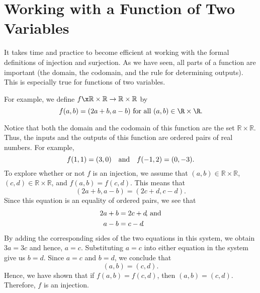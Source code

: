\section*{Working with a Function of Two Variables}
It takes time and practice to become efficient at working with the formal definitions of injection and surjection.  As we have seen, all parts of a function are important (the domain, the codomain, and the rule for determining outputs).  This is especially true for functions of two variables.


For example, we define  $f\x \mathbb{R} \times \mathbb{R} \to \mathbb{R} \times \mathbb{R}$  by  
\[
f( {a, b} ) = ( {2a + b, a - b} )  \text{ for all } 
( {a, b} ) \in \R \times \R.
\]

Notice that both the domain and the codomain of this function are the set  
$\mathbb{R} \times \mathbb{R}$.  Thus, the inputs and the outputs of this function are ordered pairs of real numbers.  For example,
\[
 f( {1, 1} ) = ( {3, 0} ) \quad \text{and} \quad f( { - 1, 2} ) = ( {0,  - 3} ). \\ 
\]
To explore whether or not  $f$  is an injection, we assume that  
$( {a, b} ) \in \mathbb{R} \times \mathbb{R}$, 
$( {c, d} ) \in \mathbb{R} \times \mathbb{R}$, and   
$f( {a, b} ) = f( {c, d} )$.  This means that
\[
( {2a + b, a - b} ) = ( {2c + d, c - d} ).
\]
Since this equation is an equality of ordered pairs, we see that
\[
\begin{aligned}
   2a + b &= 2c + d\text{\!, and} \\ 
    a - b &= c - d\!. \\ 
\end{aligned}
\]
By adding the corresponding sides of the two equations in this system, we obtain  $3a = 3c$ and hence, $a = c$.  Substituting  $a = c$ into either equation in the system give us  $b = d$.  Since  $a = c$
  and   $b = d$, we conclude that
\[
( {a, b} ) = ( {c, d} ).
\]
Hence, we have shown that if $f( {a, b} ) = f( {c, d} )$, then  
$( {a, b} ) = ( {c, d} )$.  Therefore,  $f$  is an injection.

